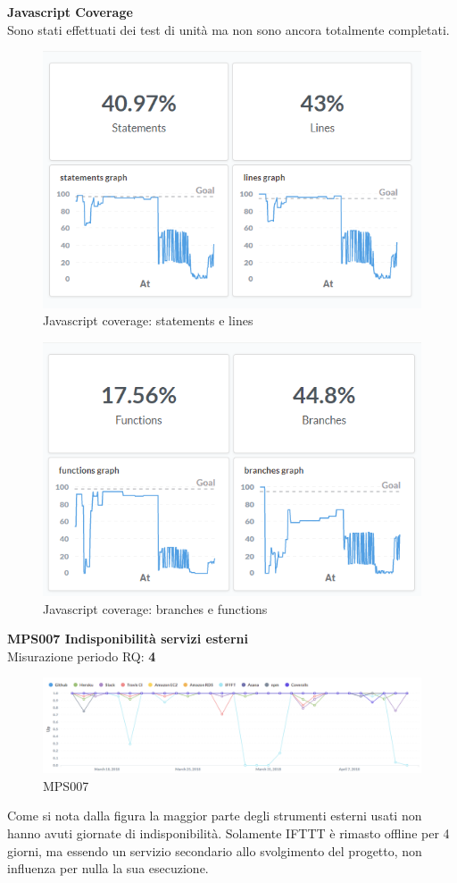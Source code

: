 \documentclass[PianoDiQualifica.tex]{subfiles}
\begin{document}
\textbf{Javascript Coverage}\\
Sono stati effettuati dei test di unità ma non sono ancora totalmente completati.
\begin{figure}[H]
	\centering
	\includegraphics[width=0.7\linewidth]{RQ/JsCoverage1}
	\caption{Javascript coverage: statements e lines}
	\label{fig:processi}
\end{figure}
\begin{figure}[H]
	\centering
	\includegraphics[width=0.7\linewidth]{RQ/JsCoverage2}
	\caption{Javascript coverage: branches e functions}
	\label{fig:processi}
\end{figure}
\newpage
\textbf{MPS007 Indisponibilità servizi esterni}\\
Misurazione periodo RQ: \textbf{4}
\begin{figure}[H]
	\centering
	\includegraphics[width=1\linewidth]{RQ/MPS007}
	\caption{MPS007}
	\label{fig:processi}
\end{figure}
Come si nota dalla figura la maggior parte degli strumenti esterni usati non hanno avuti giornate di indisponibilità.
Solamente IFTTT è rimasto offline per 4 giorni, ma essendo un servizio secondario allo svolgimento del progetto, non influenza per nulla la sua esecuzione. \\
\end{document}
